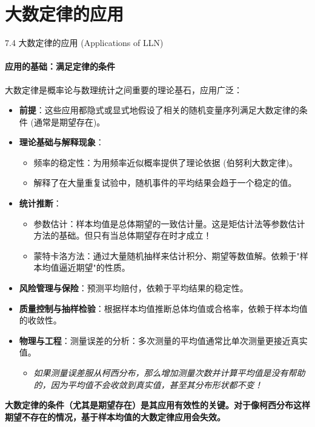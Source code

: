 \documentclass[UTF8]{beamer}
\begin{document}
\section{大数定律的应用}
\begin{frame}[shrink=5]{7.4 大数定律的应用 (Applications of LLN)}
    \framesubtitle{应用的基础：满足定律的条件}
    大数定律是概率论与数理统计之间重要的理论基石，应用广泛：
    \begin{itemize}
        \item \textbf{前提}：这些应用都隐式或显式地假设了相关的随机变量序列满足大数定律的条件 (通常是期望存在)。
        \item \textbf{理论基础与解释现象}：
            \begin{itemize}
                \item \alert{频率的稳定性}：为用频率近似概率提供了理论依据 (伯努利大数定律)。
                \item 解释了在大量重复试验中，随机事件的平均结果会趋于一个稳定的值。
            \end{itemize}
        \item \textbf{统计推断}：
            \begin{itemize}
                \item \alert{参数估计}：样本均值是总体期望的\alert{一致估计量}。这是矩估计法等参数估计方法的基础。\alert{但只有当总体期望存在时才成立！}
                \item \alert{蒙特卡洛方法}：通过大量随机抽样来估计积分、期望等数值解。依赖于"样本均值逼近期望"的性质。
            \end{itemize}
        \item \textbf{风险管理与保险}：预测平均赔付，依赖于平均结果的稳定性。
        \item \textbf{质量控制与抽样检验}：根据样本均值推断总体均值或合格率，依赖于样本均值的收敛性。
        \item \textbf{物理与工程}：测量误差的分析：多次测量的平均值通常比单次测量更接近真实值。
            \begin{itemize}
                \item \textit{如果测量误差服从柯西分布，那么增加测量次数并计算平均值是\alert{没有帮助的}，因为平均值不会收敛到真实值，甚至其分布形状都不变！}
            \end{itemize}
    \end{itemize}
    \textbf{大数定律的条件（尤其是期望存在）是其应用有效性的关键。对于像柯西分布这样期望不存在的情况，基于样本均值的大数定律应用会失效。}
\end{frame}
\end{document}
